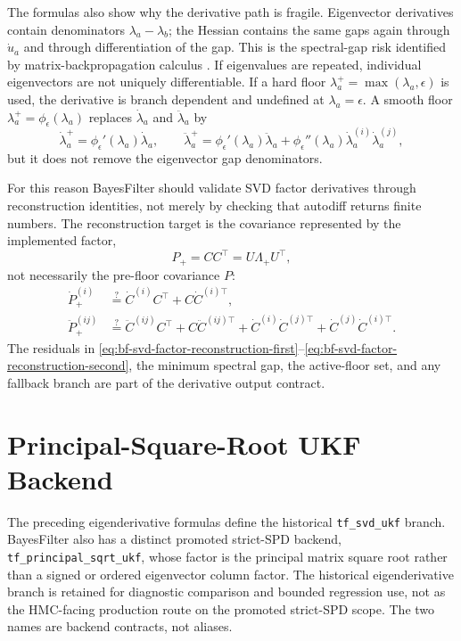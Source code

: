 The formulas also show why the derivative path is fragile.  Eigenvector
derivatives contain denominators $\lambda_a-\lambda_b$; the Hessian contains
the same gaps again through $\dot u_a$ and through differentiation of the gap.
This is the spectral-gap risk identified by matrix-backpropagation calculus
\citep{ionescu2015matrixbackprop}.  If eigenvalues are repeated, individual
eigenvectors are not uniquely differentiable.  If a hard floor
$\lambda_a^+=\max(\lambda_a,\epsilon)$ is used, the derivative is branch
dependent and undefined at $\lambda_a=\epsilon$.  A smooth floor
$\lambda_a^+=\phi_\epsilon(\lambda_a)$ replaces
$\dot\lambda_a$ and $\ddot\lambda_a$ by
\[
  \dot\lambda_a^+=\phi_\epsilon'(\lambda_a)\dot\lambda_a,\qquad
  \ddot\lambda_a^+
  =
  \phi_\epsilon'(\lambda_a)\ddot\lambda_a
  +\phi_\epsilon''(\lambda_a)\dot\lambda_a^{(i)}\dot\lambda_a^{(j)},
\]
but it does not remove the eigenvector gap denominators.

For this reason BayesFilter should validate SVD factor derivatives through
reconstruction identities, not merely by checking that autodiff returns finite
numbers.  The reconstruction target is the covariance represented by the
implemented factor,
\[
  P_+ = CC^\top=U\Lambda_+U^\top,
\]
not necessarily the pre-floor covariance $P$:
\begin{align}
\label{eq:bf-svd-factor-reconstruction-first}
  \dot P_+^{(i)}
  &\stackrel{?}{=}
  \dot C^{(i)}C^\top+C\dot C^{(i)\top},\\
\label{eq:bf-svd-factor-reconstruction-second}
  \ddot P_+^{(ij)}
  &\stackrel{?}{=}
  \ddot C^{(ij)}C^\top+C\ddot C^{(ij)\top}
  +\dot C^{(i)}\dot C^{(j)\top}
  +\dot C^{(j)}\dot C^{(i)\top}.
\end{align}
The residuals in
\eqref{eq:bf-svd-factor-reconstruction-first}--\eqref{eq:bf-svd-factor-reconstruction-second},
the minimum spectral gap, the active-floor set, and any fallback branch are part
of the derivative output contract.

\section{Principal-Square-Root UKF Backend}
\label{sec:bf-svd-principal-sqrt-backend}

The preceding eigenderivative formulas define the historical
\texttt{tf\_svd\_ukf} branch.  BayesFilter also has a distinct promoted
strict-SPD backend, \texttt{tf\_principal\_sqrt\_ukf}, whose factor is the
principal matrix square root rather than a signed or ordered eigenvector column
factor.  The historical eigenderivative branch is retained for diagnostic
comparison and bounded regression use, not as the HMC-facing production route on
the promoted strict-SPD scope.  The two names are backend contracts, not
aliases.

